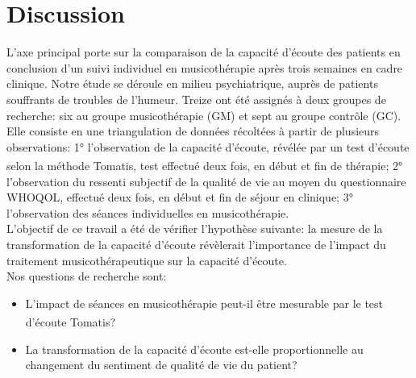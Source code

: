 \chapter{Discussion}
\label{Conclusions}
 L'axe principal porte sur la comparaison de la capacité d'écoute des patients en conclusion d'un suivi 
individuel en musicothérapie après trois semaines en cadre clinique.
Notre étude se déroule  en milieu psychiatrique, 
auprès de patients souffrants de troubles de l'humeur.
 Treize ont été assignés à deux groupes de recherche: 
six au groupe
musicothérapie (GM) et sept au groupe contrôle (GC).
 Elle consiste en une triangulation de données 
récoltées à partir de plusieurs observations:  
1° l'observation de la capacité d'écoute, révélée par un test 
d'écoute selon la méthode Tomatis\textsuperscript \textregistered, test effectué deux fois, en début et 
fin de thérapie;
2° l'observation du ressenti subjectif de la qualité de vie au moyen du 
questionnaire WHOQOL, effectué deux fois, en début et fin de séjour en clinique;
3° l'observation des séances  individuelles en musicothérapie. 
 \\
L'objectif de ce travail a été de vérifier l'hypothèse suivante: 
la  mesure de la  transformation de la capacité d'écoute révèlerait  l'importance de l'impact  du 
 traitement musicothérapeutique sur la capacité d'écoute.
\\
Nos questions de recherche sont: 
\begin{itemize}
	\item L'impact de séances en musicothérapie  peut-il être mesurable par le test 
	d'écoute Tomatis\textsuperscript \textregistered?
	\item La transformation de la capacité d'écoute est-elle  proportionnelle au changement 
	du sentiment de qualité de vie du patient?
\end{itemize}
